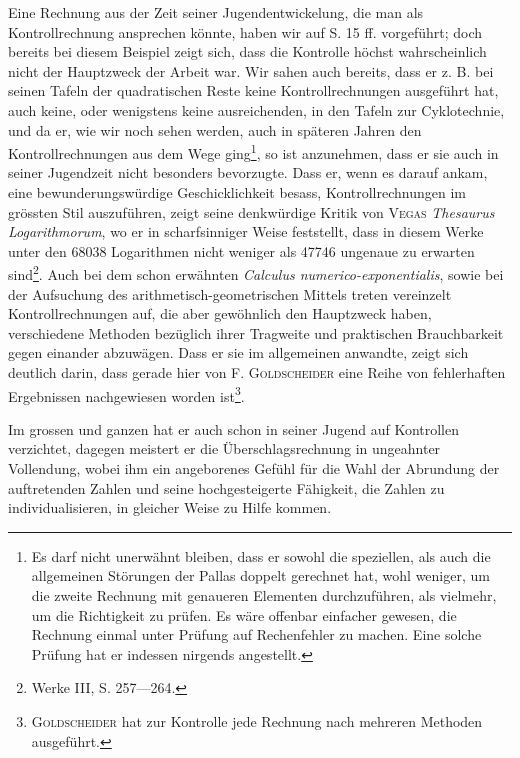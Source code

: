 Eine Rechnung aus der Zeit seiner Jugendentwickelung, die man als
Kontrollrechnung ansprechen könnte, haben wir auf S. 15 ff. vorgeführt; doch
bereits bei diesem Beispiel zeigt sich, dass die Kontrolle höchst wahrscheinlich nicht der Hauptzweck der Arbeit war. Wir sahen auch bereits, dass
er z. B. bei seinen Tafeln der quadratischen Reste keine Kontrollrechnungen
ausgeführt hat, auch keine, oder wenigstens keine ausreichenden, in den Tafeln
zur Cyklotechnie, und da er, wie wir noch sehen werden, auch in späteren
Jahren den Kontrollrechnungen aus dem Wege ging\footnote{Es darf nicht unerwähnt bleiben, dass er sowohl die speziellen, als auch die allgemeinen Störungen
der Pallas doppelt gerechnet hat, wohl weniger, um die zweite Rechnung mit genaueren Elementen durchzuführen, als vielmehr, um die Richtigkeit zu prüfen. Es wäre offenbar einfacher gewesen, die Rechnung
einmal unter Prüfung auf Rechenfehler zu machen. Eine solche Prüfung hat er indessen nirgends angestellt.}, so ist anzunehmen,
dass er sie auch in seiner Jugendzeit nicht besonders bevorzugte.
\clearpage{}
\setcounter{footnote}{0}
\noindent\hspace*{\parindent}Dass er, wenn es darauf ankam, eine bewunderungswürdige Geschicklichkeit besass, Kontrollrechnungen im grössten Stil auszuführen, zeigt seine denkwürdige Kritik von \textsc{Vegas} \textit{Thesaurus Logarithmorum}, wo er in scharfsinniger
Weise feststellt, dass in diesem Werke unter den 68038 Logarithmen nicht
weniger als 47746 ungenaue zu erwarten sind\footnote{Werke III, S. 257—264.}. Auch bei dem schon erwähnten \textit{Calculus numerico-exponentialis}, sowie bei der Aufsuchung des arithmetisch-geometrischen Mittels treten vereinzelt Kontrollrechnungen auf, die
aber gewöhnlich den Hauptzweck haben, verschiedene Methoden bezüglich
ihrer Tragweite und praktischen Brauchbarkeit gegen einander abzuwägen.
Dass er sie im allgemeinen  anwandte, zeigt sich deutlich darin, dass
gerade hier von F. \textsc{Goldscheider} eine Reihe von fehlerhaften Ergebnissen nachgewiesen worden ist\footnote{\textsc{Goldscheider} hat zur Kontrolle jede Rechnung nach mehreren Methoden ausgeführt.}.

Im grossen und ganzen hat er auch schon in seiner Jugend auf 
Kontrollen verzichtet, dagegen meistert er die Überschlagsrechnung in ungeahnter Vollendung, wobei ihm ein angeborenes Gefühl für die Wahl der Abrundung der auftretenden Zahlen und seine hochgesteigerte Fähigkeit, die
Zahlen zu individualisieren, in gleicher Weise zu Hilfe kommen.

